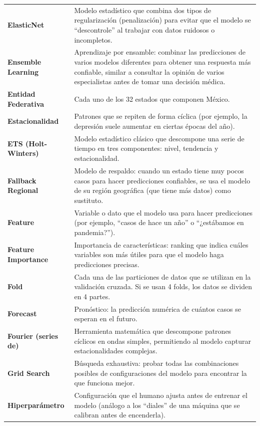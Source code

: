 \documentclass[12pt, letterpaper]{article}
\begin{document}
\begin{longtable}{>{\bfseries\small}p{3.8cm} p{11.5cm}}
\addlinespace
ElasticNet & Modelo estadístico que combina dos tipos de regularización (penalización) para evitar que el modelo se ``descontrole'' al trabajar con datos ruidosos o incompletos. \\
\addlinespace
Ensemble Learning & Aprendizaje por ensamble: combinar las predicciones de varios modelos diferentes para obtener una respuesta más confiable, similar a consultar la opinión de varios especialistas antes de tomar una decisión médica. \\
\addlinespace
Entidad Federativa & Cada uno de los 32 estados que componen México. \\
\addlinespace
Estacionalidad & Patrones que se repiten de forma cíclica (por ejemplo, la depresión suele aumentar en ciertas épocas del año). \\
\addlinespace
ETS (Holt-Winters) & Modelo estadístico clásico que descompone una serie de tiempo en tres componentes: nivel, tendencia y estacionalidad. \\
\addlinespace
Fallback Regional & Modelo de respaldo: cuando un estado tiene muy pocos casos para hacer predicciones confiables, se usa el modelo de su región geográfica (que tiene más datos) como sustituto. \\
\addlinespace
Feature & Variable o dato que el modelo usa para hacer predicciones (por ejemplo, ``casos de hace un año'' o ``¿estábamos en pandemia?''). \\
\addlinespace
Feature Importance & Importancia de características: ranking que indica cuáles variables son más útiles para que el modelo haga predicciones precisas. \\
\addlinespace
Fold & Cada una de las particiones de datos que se utilizan en la validación cruzada. Si se usan 4 folds, los datos se dividen en 4 partes. \\
\addlinespace
Forecast & Pronóstico: la predicción numérica de cuántos casos se esperan en el futuro. \\
\addlinespace
Fourier (series de) & Herramienta matemática que descompone patrones cíclicos en ondas simples, permitiendo al modelo capturar estacionalidades complejas. \\
\addlinespace
Grid Search & Búsqueda exhaustiva: probar todas las combinaciones posibles de configuraciones del modelo para encontrar la que funciona mejor. \\
\addlinespace
Hiperparámetro & Configuración que el humano ajusta antes de entrenar el modelo (análogo a los ``diales'' de una máquina que se calibran antes de encenderla). \\

\end{longtable}
\end{document}
